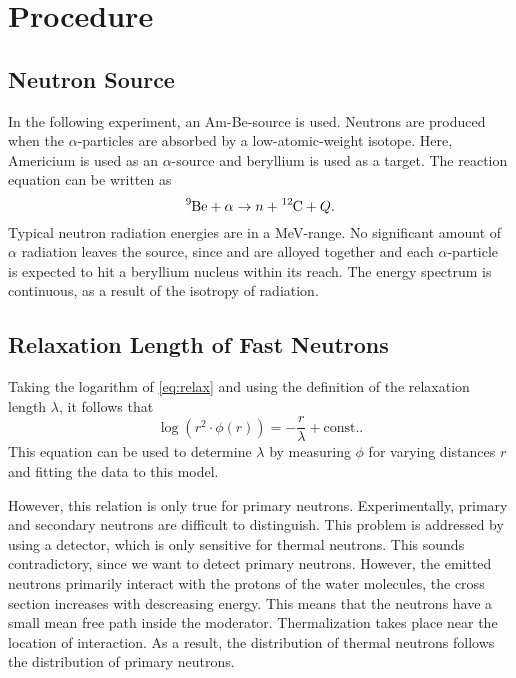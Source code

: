 \chapter{Procedure}
\section{Neutron Source}
In the following experiment, an Am-Be-source is used.
Neutrons are produced when the $\alpha$-particles are absorbed by a low-atomic-weight isotope.
Here, Americium is used as an $\alpha$-source and beryllium is used as a target.
The reaction equation can be written as
\begin{equation*}
	\ce{^{9}Be} + \alpha \rightarrow n + \ce{^{12}C} + Q.
\end{equation*}
Typical neutron radiation energies are in a \si{MeV}-range.
No significant amount of $\alpha$ radiation leaves the source, since  and  are alloyed together and each $\alpha$-particle is expected to hit a beryllium nucleus within its reach.
The energy spectrum is continuous, as a result of the isotropy of radiation.

\section{Relaxation Length of Fast Neutrons}\label{sec:relaxa}
Taking the logarithm of \autoref{eq:relax} and using the definition of the relaxation length $\lambda$, it follows that
\begin{equation*}
	\log(r^2\cdot\phi(r)) = -\frac{r}{\lambda} + \text{const.}.
\end{equation*}
This equation can be used to determine $\lambda$ by measuring $\phi$ for varying distances $r$ and fitting the data to this model.

However, this relation is only true for primary neutrons.
Experimentally, primary and secondary neutrons are difficult to distinguish.
This problem is addressed by using a  detector, which is only sensitive for thermal neutrons.
This sounds contradictory, since we want to detect primary neutrons.
However, the emitted neutrons primarily interact with the protons of the water molecules, the cross section increases with descreasing energy.
This means that the neutrons have a small mean free path inside the moderator.
Thermalization takes place near the location of interaction.
As a result, the distribution of thermal neutrons follows the distribution of primary neutrons.

